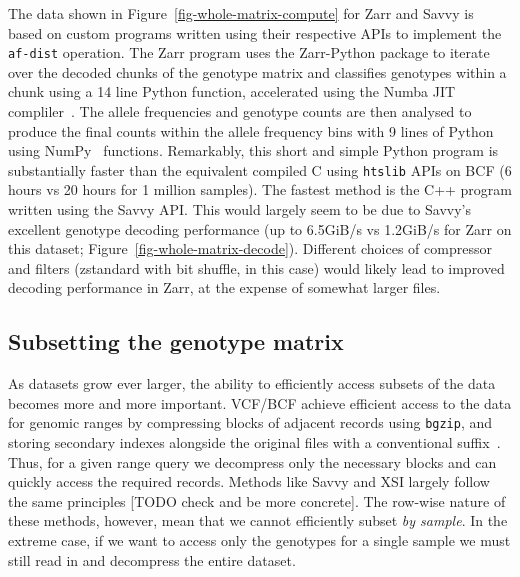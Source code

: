 \documentclass[a4paper,num-refs]{oup-contemporary}
\begin{document}
The data shown in Figure~\ref{fig-whole-matrix-compute} for Zarr and Savvy
is based on custom programs written using their respective APIs
to implement the \texttt{af-dist} operation. The Zarr program uses
the Zarr-Python package to iterate over the decoded chunks of the 
genotype matrix and classifies genotypes within a chunk using a 14 line Python
function, accelerated using the Numba JIT compliler~\cite{lam2015numba}.
The allele frequencies and genotype counts are then analysed to produce 
the final counts within the allele frequency bins with 9 lines of 
Python using NumPy~\cite{harris2020array} functions. Remarkably, this 
short and simple Python program is substantially faster than the 
equivalent compiled C using \texttt{htslib} APIs on BCF (6 hours
vs 20 hours for 1 million samples). The fastest method is the 
C++ program written using the Savvy API. This would largely seem
to be due to Savvy's excellent genotype decoding performance
(up to 6.5GiB/s vs 1.2GiB/s for Zarr on this dataset;
Figure~\ref{fig-whole-matrix-decode}). Different choices 
of compressor and filters (zstandard with bit shuffle, in this case) 
would likely lead to improved decoding performance in Zarr,
at the expense of somewhat larger files.

\subsection{Subsetting the genotype matrix}
As datasets grow ever larger, the ability to efficiently access subsets 
of the data becomes more and more important. VCF/BCF achieve efficient 
access to the data for genomic ranges 
by compressing blocks of adjacent records using \texttt{bgzip},
and storing secondary indexes alongside the original 
files with a conventional suffix~\citep{li2011tabix}. 
Thus, for a given range query we 
decompress only the necessary blocks and can quickly access
the required records. 
Methods like Savvy and XSI largely follow the same principles [TODO check and 
be more concrete]. The row-wise nature of these methods, however, mean 
that we cannot efficiently subset \emph{by sample}. In the extreme
case, if we want to access only the genotypes for a single sample
we must still read in and decompress the entire dataset.
\end{document}
